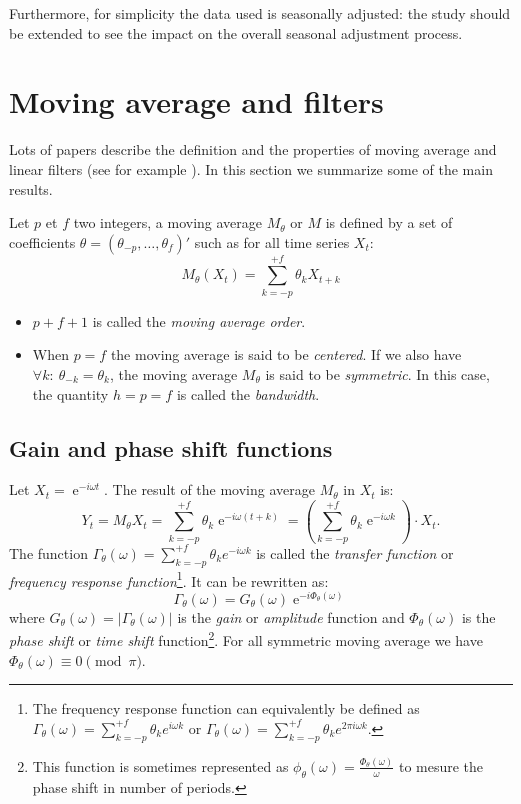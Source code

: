 \documentclass[
  12pt,
  ,
  a4paper]{article}
\DeclareMathOperator{\e}{e}
\newcommand\1{\mathds{1}}
\begin{document}
Furthermore, for simplicity the data used is seasonally adjusted: the study should be extended to see the impact on the overall seasonal adjustment process.

\hypertarget{sec:propMM}{%
\section{Moving average and filters}\label{sec:propMM}}

Lots of papers describe the definition and the properties of moving average and linear filters (see for example \textcite{ch12HBSA}).
In this section we summarize some of the main results.

Let \(p\) et \(f\) two integers, a moving average \(M_\theta\) or \(M\) is defined by a set of coefficients \(\theta=(\theta_{-p},\dots,\theta_{f})'\) such as for all time series \(X_t\):
\[
M_\theta(X_t)=\sum_{k=-p}^{+f}\theta_kX_{t+k}
\]

\begin{itemize}
\item
  \(p+f+1\) is called the \emph{moving average order}.
\item
  When \(p=f\) the moving average is said to be \emph{centered}.
  If we also have \(\forall k:\:\theta_{-k} = \theta_k\), the moving average \(M_\theta\) is said to be \emph{symmetric}.
  In this case, the quantity \(h=p=f\) is called the \emph{bandwidth}.
\end{itemize}

\hypertarget{gain-and-phase-shift-functions}{%
\subsection{Gain and phase shift functions}\label{gain-and-phase-shift-functions}}

Let \(X_t=\e^{-i\omega t}\). The result of the moving average \(M_\theta\) in \(X_t\) is:
\[
Y_t = M_{\theta}X_t = \sum_{k=-p}^{+f} \theta_k \e^{-i \omega (t+k)}
= \left(\sum_{k=-p}^{+f} \theta_k \e^{-i \omega k}\right)\cdot X_t.
\]
The function \(\Gamma_\theta(\omega)=\sum_{k=-p}^{+f} \theta_k e^{-i \omega k}\) is called the \emph{transfer function} or \emph{frequency response function}\footnote{The frequency response function can equivalently be defined as \(\Gamma_\theta(\omega)=\sum_{k=-p}^{+f} \theta_k e^{i \omega k}\) or \(\Gamma_\theta(\omega)=\sum_{k=-p}^{+f} \theta_k e^{2\pi i \omega k}\).}.
It can be rewritten as:
\[
\Gamma_\theta(\omega) = G_\theta(\omega)\e^{-i\Phi_\theta(\omega)}
\]
where \(G_\theta(\omega)=\lvert\Gamma_\theta(\omega)\rvert\) is the \emph{gain} or \emph{amplitude} function and \(\Phi_\theta(\omega)\) is the \emph{phase shift} or \emph{time shift} function\footnote{This function is sometimes represented as \(\phi_\theta(\omega)=\frac{\Phi_\theta(\omega)}{\omega}\) to mesure the phase shift in number of periods.}.
For all symmetric moving average we have \(\Phi_\theta(\omega)\equiv 0 \pmod{\pi}\).
\end{document}
